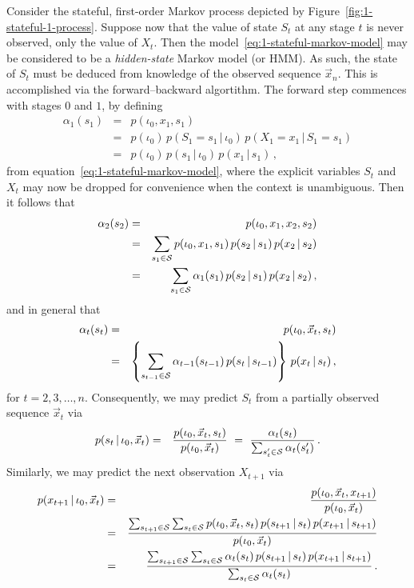 \documentclass[a4paper]{article}
\begin{document}
Consider the stateful, first-order Markov process depicted by Figure~\ref{fig:1-stateful-1-process}.
Suppose now that the value of state $S_t$ at any stage $t$ is never observed, only the value of $X_t$.
Then the model~\eqref{eq:1-stateful-markov-model} may be considered to be a {\em hidden-state} Markov model (or HMM).
As such, the state of $S_t$ must be deduced from knowledge of the observed sequence $\vec{x}_n$. This is accomplished
via the forward--backward algortithm. The forward step commences with stages $0$ and $1$, by defining
\begin{eqnarray}
  \alpha_1(s_1) & = & p(\iota_0,x_1,s_1)
\nonumber\\
& = & p(\iota_0)\,p(S_1=s_1\,|\,\iota_0)\,p(X_1=x_1\,|\,S_1=s_1)
\nonumber\\
& = & p(\iota_0)\,p(s_1\,|\,\iota_0)\,p(x_1\,|\,s_1)
\,,
\end{eqnarray}
from equation~\eqref{eq:1-stateful-markov-model}, where the explicit variables $S_t$ and $X_t$ may now be
dropped for convenience when the context is unambiguous.
Then it follows that
\begin{eqnarray}
  \alpha_2(s_2) & = & p(\iota_0,x_1,x_2,s_2)
\nonumber\\
& = & \sum_{s_1\in{\cal S}}p(\iota_0,x_1,s_1)\,p(s_2\,|\,s_1)\,p(x_2\,|\,s_2)
\nonumber\\
& = & \sum_{s_1\in{\cal S}}\alpha_1(s_1)\,p(s_2\,|\,s_1)\,p(x_2\,|\,s_2)\,,
\end{eqnarray}
and in general that
\begin{eqnarray}
   \alpha_t(s_t) & = & p(\iota_0,\vec{x}_t,s_t)
\nonumber\\
& = & \left\{\sum_{s_{t-1}\in{\cal S}}\alpha_{t-1}(s_{t-1})\,p(s_t\,|\,s_{t-1})\right\}\,p(x_t\,|\,s_t)\,,
\end{eqnarray}
for $t=2,3,\ldots,n$.
Consequently, we may predict $S_t$ from a partially observed sequence $\vec{x}_t$ via
\begin{eqnarray}
  p(s_t\,|\,\iota_0,\vec{x}_t) & = & \frac{p(\iota_0,\vec{x}_t,s_t)}{p(\iota_0,\vec{x}_t)}
~=~\frac{\alpha_t(s_t)}{\sum_{s_t'\in{\cal S}}\alpha_t(s_t')}\,.
\end{eqnarray}
Similarly, we may predict the next observation $X_{t+1}$ via
\begin{eqnarray}
  p(x_{t+1}\,|\,\iota_0,\vec{x}_t) 
& = &
  \frac{p(\iota_0,\vec{x}_t,x_{t+1})}{p(\iota_0,\vec{x}_t)}
\nonumber\\
& = & 
 \frac{\sum_{s_{t+1}\in{\cal S}}\sum_{s_{t}\in{\cal S}}p(\iota_0,\vec{x}_t,s_t)\,p(s_{t+1}\,|\,s_t)\,p(x_{t+1}\,|\,s_{t+1})}
        {p(\iota_0,\vec{x}_t)}
\nonumber\\
& = &
  \frac{\sum_{s_{t+1}\in{\cal S}}\sum_{s_{t}\in{\cal S}}\alpha_t(s_t)\,p(s_{t+1}\,|\,s_t)\,p(x_{t+1}\,|\,s_{t+1})}{\sum_{s_t\in{\cal S}}\alpha_t(s_t)}\,.
\end{eqnarray}
\end{document}
